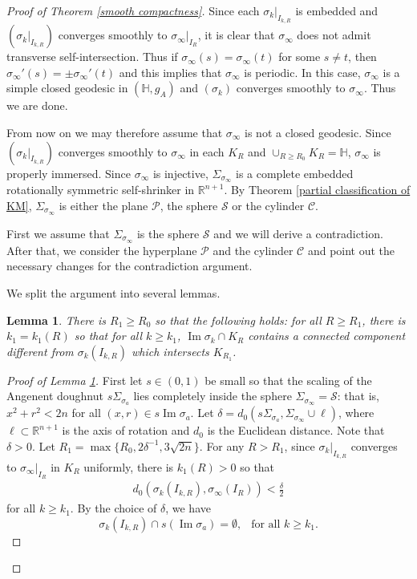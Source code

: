 \documentclass[12pt]{amsart}
\numberwithin{equation}{section}
\newtheorem{lem}[thm]{Lemma}
\theoremstyle{remark}
\begin{document}
\begin{proof} [Proof of Theorem \ref{smooth compactness}]
		Since each $\sigma_k|_{I_{k, R}}$ is embedded and $(\sigma_k|_{I_{k, R}})$ converges smoothly to $\sigma_\infty |_{I_R}$, it is clear that $\sigma_\infty$ does not admit transverse self-intersection. Thus if $\sigma_\infty  (s) = \sigma_\infty (t)$ for some $s\neq t$, then $\sigma_\infty'(s) = \pm \sigma_{\infty}' (t)$ and this implies that $\sigma_\infty$ is periodic. In this case, $\sigma_\infty$ is a simple closed geodesic in $(\mathbb H, g_A)$ and $(\sigma_k)$ converges smoothly to $\sigma_\infty$. Thus we are done. 
		
		From now on we may therefore assume that $\sigma_\infty$ is not a closed geodesic. Since $(\sigma_k|_{I_{k, R}})$ converges smoothly to $\sigma_\infty$ in each $K_R$ and $\cup_{R\ge R_0} K_R = \mathbb H$, $\sigma_\infty$ is properly immersed. Since $\sigma_\infty$ is injective, $\Sigma_{\sigma_\infty}$ is a complete embedded rotationally symmetric self-shrinker in $\mathbb R^{n+1}$. By Theorem \ref{partial classification of KM}, $\Sigma_{\sigma_\infty}$ is either the plane $\mathcal P$, the sphere $\mathcal S$ or the cylinder $\mathcal C$. 
		
		First we assume that $\Sigma_{\sigma_\infty}$ is the sphere $\mathcal S$ and we will derive a contradiction. After that, we consider the hyperplane $\mathcal P$ and the cylinder $\mathcal C$ and point  out the necessary changes for the contradiction argument. 
		
		We split the argument into several lemmas.
		
		\begin{lem} \label{claim 1} There is $R_1 \ge R_0$ so that the following holds: for all $R \ge R_1$, there is $k_1 = k_1(R)$ so that for all $k\ge k_1$, $\operatorname{Im}\sigma_k\cap K_R$ contains a connected component different from $\sigma_k (I_{k,R})$ which intersects $K_{R_1}$. 
		\end{lem}
		
		\begin{proof} [Proof of Lemma \ref{claim 1}] First let $s\in (0,1)$ be small so that the scaling of the Angenent doughnut $s\Sigma_{\sigma_a}$ lies completely inside the sphere $\Sigma_{\sigma_\infty}=\mathcal S$: that is, $x^2 + r^2 < 2n$ for all $(x, r) \in s\operatorname{Im}\sigma_a$. Let $\delta = d_0 (s\Sigma_{\sigma_a}, \Sigma_{\sigma_\infty} \cup \ell)$, where $\ell \subset \mathbb{R}^{n+1}$ is the axis of rotation and $d_0$ is the Euclidean distance. Note that $\delta >0$. Let $R_1 = \max\{ R_0, 2\delta^{-1}, 3\sqrt{2n}\}$. For any $R >R_1$, since $\sigma_k|_{I_{k, R}}$ converges to $\sigma_\infty|_{I_{R}}$ in $K_R$ uniformly, there is $k_1(R)>0$ so that 
			\begin{align} \label{d_0(sigma_k(I_k, R), sigma_infty(I_R)) <delta/2}
				d_0(\sigma_k(I_{k, R}), \sigma_\infty(I_R)) <\frac{\delta}{2}
			\end{align} 
			for all $k\ge k_1$. By the choice of $\delta$, we have
			$$\sigma_k(I_{k, R}) \cap s(\operatorname{Im}\sigma_a) = \emptyset,\ \ \text{ for all } k\ge k_1.$$
			

\end{proof}
\end{proof}
\end{document}
